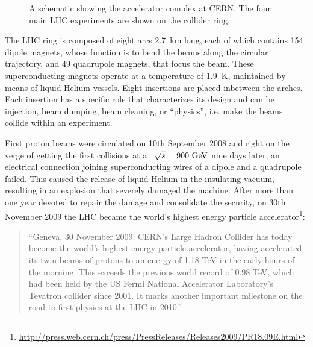\begin{figure}[tb]\begin{center}
	\caption{A schematic showing the accelerator complex at CERN.
 The four main LHC experiments are shown on the collider ring.
\label{fig:lhcring}}
\end{center}\end{figure}



The LHC ring is composed of eight arcs 2.7~km long, each of which contains 154 dipole 
magnets, whose function is to  bend the beams along the circular trajectory, and
49 quadrupole magnets, that focus the beam. These superconducting magnets operate
at a temperature of 1.9~K, maintained by means of liquid Helium vessels.
Eight insertions are placed inbetween the arches. Each insertion has a specific
role that characterizes its design and can be injection, beam dumping, beam cleaning,
or ``physics'', i.e. make the beams collide within an experiment.

First proton beams were circulated on 10th September 2008 and right on the verge of
getting the first collisions at a \cme\ $\rts=900\gev$ nine days later, an electrical
connection joining superconducting wires of a dipole and a quadrupole
failed. This caused the release of liquid Helium in the insulating vacuum,
resulting in an explosion that severely damaged the machine.
After more than one year devoted to repair the damage and consolidate the security,
on 30th November 2009 the LHC became the world's highest energy particle 
accelerator\footnote{\url{http://press.web.cern.ch/press/PressReleases/Releases2009/PR18.09E.html}}:
\begin{quotation}\small
``Geneva, 30 November 2009. CERN's Large Hadron Collider has today become the world’s highest energy particle accelerator, having accelerated its twin beams of protons to an energy of 1.18 TeV in the early hours of the morning. This exceeds the previous world record of 0.98 TeV, which had been held by the US Fermi National Accelerator Laboratory’s Tevatron collider since 2001. It marks another important milestone on the road to first physics at the LHC in 2010.''
\end{quotation}



